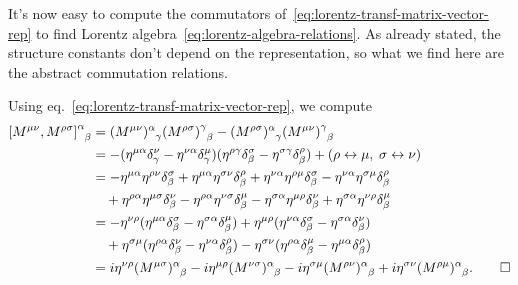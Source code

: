 It's now easy to compute the commutators of~\eqref{eq:lorentz-transf-matrix-vector-rep} to find Lorentz algebra~\eqref{eq:lorentz-algebra-relations}. As already stated, the structure constants don't depend on the representation, so what we find here are the abstract commutation relations.
\begin{mdframed}
\begin{innerproof}
    Using eq.~\eqref{eq:lorentz-transf-matrix-vector-rep}, we compute
    \begin{equation*}
    \begin{split}
        \tensor{\comm{M^{\mu\nu}}{M^{\rho\sigma}}}{^\alpha_\beta} &= \tensor{(M^{\mu\nu})}{^\alpha_\gamma} \tensor{(M^{\rho\sigma})}{^\gamma_\beta} - \tensor{(M^{\rho\sigma})}{^\alpha_\gamma} \tensor{(M^{\mu\nu})}{^\gamma_\beta}  \\
        &= - (\eta^{\mu\alpha} \delta^\nu_\gamma - \eta^{\nu\alpha} \delta^\mu_\gamma) (\eta^{\rho\gamma} \delta^\sigma_\beta - \eta^{\sigma\gamma} \delta^\rho_\beta) + (\rho \leftrightarrow \mu, \; \sigma \leftrightarrow \nu) \\
        & = -\eta^{\mu\alpha} \eta^{\rho\nu} \delta^\sigma_\beta + \eta^{\mu\alpha} \eta^{\sigma\nu} \delta^\rho_\beta + \eta^{\nu\alpha} \eta^{\rho\mu} \delta^\sigma_\beta - \eta^{\nu\alpha} \eta^{\sigma\mu} \delta^\rho_\beta \\
        &\quad + \eta^{\rho\alpha} \eta^{\mu\sigma} \delta^\nu_\beta - \eta^{\rho\alpha} \eta^{\nu\sigma} \delta^\mu_\beta - \eta^{\sigma\alpha} \eta^{\mu\rho} \delta^\nu_\beta + \eta^{\sigma\alpha} \eta^{\nu\rho} \delta^\mu_\beta \\
        &= - \eta^{\nu\rho} ( \eta^{\mu\alpha} \delta^\sigma_\beta - \eta^{\sigma\alpha} \delta^\mu_\beta ) + \eta^{\mu\rho} ( \eta^{\nu\alpha} \delta^\sigma_\beta - \eta^{\sigma\alpha} \delta^\nu_\beta ) \\
        &\quad + \eta^{\sigma\mu} ( \eta^{\rho\alpha} \delta^\nu_\beta - \eta^{\nu\alpha} \delta^\rho_\beta) - \eta^{\sigma\nu} (\eta^{\rho\alpha} \delta^\mu_\beta - \eta^{\mu\alpha} \delta^\rho_\beta) \\
        &= i  \eta^{\nu\rho} \tensor{(M^{\mu\sigma})}{^\alpha_\beta}  - i \eta^{\mu\rho} \tensor{(M^{\nu\sigma})}{^\alpha_\beta} - i \eta^{\sigma\mu}  \tensor{(M^{\rho\nu})}{^\alpha_\beta} +  i \eta^{\sigma\nu} \tensor{(M^{\rho\mu})}{^\alpha_\beta} . \qedhere
    \end{split}
    \end{equation*}
\end{innerproof}
\end{mdframed}

